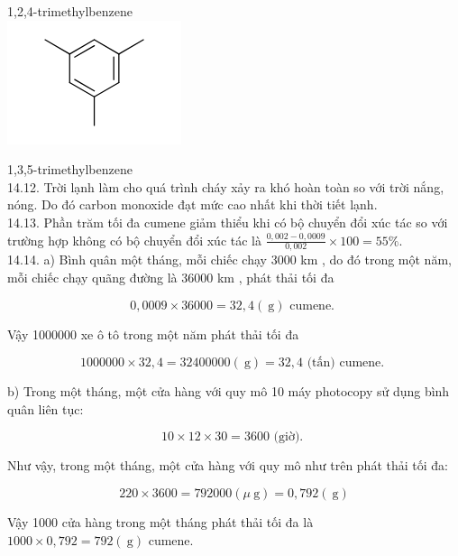 \documentclass[10pt]{article}
\begin{document}
1,2,4-trimethylbenzene\\
\includegraphics{smile-f791be6e9fcbed6a6f811ba95952381f360b150f}

1,3,5-trimethylbenzene\\
14.12. Trời lạnh làm cho quá trình cháy xảy ra khó hoàn toàn so với trời nắng, nóng. Do đó carbon monoxide đạt mức cao nhất khi thời tiết lạnh.\\
14.13. Phần trăm tối đa cumene giảm thiểu khi có bộ chuyển đổi xúc tác so với trường hợp không có bộ chuyển đổi xúc tác là $\frac{0,002-0,0009}{0,002} \times 100=55 \%$.\\
14.14. a) Bình quân một tháng, mỗi chiếc chạy 3000 km , do đó trong một năm, mỗi chiếc chạy quãng đường là 36000 km , phát thải tối đa

$$
0,0009 \times 36000=32,4(\mathrm{~g}) \text { cumene. }
$$

Vậy 1000000 xe ô tô trong một năm phát thải tối đa

$$
1000000 \times 32,4=32400000(\mathrm{~g})=32,4 \text { (tấn) cumene. }
$$

b) Trong một tháng, một cửa hàng với quy mô 10 máy photocopy sử dụng bình quân liên tục:

$$
10 \times 12 \times 30=3600 \text { (giờ). }
$$

Như vậy, trong một tháng, một cửa hàng với quy mô như trên phát thải tối đa:

$$
220 \times 3600=792000(\mu \mathrm{~g})=0,792(\mathrm{~g})
$$

Vậy 1000 cửa hàng trong một tháng phát thải tối đa là\\
$1000 \times 0,792=792(\mathrm{~g})$ cumene.
\end{document}
